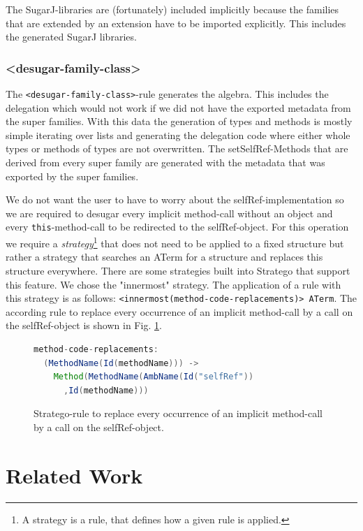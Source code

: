 \documentclass{report}
\begin{document}
The SugarJ-libraries are (fortunately) included implicitly because the families that are extended by an extension have to be imported explicitly. This includes the generated SugarJ libraries.

\subsubsection{\textless{}desugar-family-class\textgreater}
The \lstinline{<desugar-family-class>}-rule generates the algebra. This includes the delegation which would not work if we did not have the exported metadata from the super families. With this data the generation of types and methods is mostly simple iterating over lists and generating the delegation code where either whole types or methods of types are not overwritten. The setSelfRef-Methods that are derived from every super family are generated with the metadata that was exported by the super families.

We do not want the user to have to worry about the selfRef-implementation so we are required to desugar every implicit method-call without an object and every \lstinline{this}-method-call to be redirected to the selfRef-object. For this operation we require a \emph{strategy}\footnote{A strategy is a rule, that defines how a given rule is applied.} that does not need to be applied to a fixed structure but rather a strategy that searches an ATerm for a structure and replaces this structure everywhere. There are some strategies built into Stratego that support this feature. We chose the "innermost" strategy. The application of a rule with this strategy is as follows: \lstinline{<innermost(method-code-replacements)> ATerm}. The according rule to replace every occurrence of an implicit method-call by a call on the selfRef-object is shown in Fig. \ref{replaceMethodBySelfRef}.

\begin{figure}[H]
\begin{lstlisting}[language=java,breaklines=false,morekeywords={familyname,super,familyClasses},keywordstyle=\bfseries\color{OliveGreen}]
method-code-replacements:
  (MethodName(Id(methodName))) ->
    Method(MethodName(AmbName(Id("selfRef"))
      ,Id(methodName)))
\end{lstlisting}
\caption{Stratego-rule to replace every occurrence of an implicit method-call by a call on the selfRef-object.}
\label{replaceMethodBySelfRef}
\end{figure}

\section{Related Work}
\end{document}
